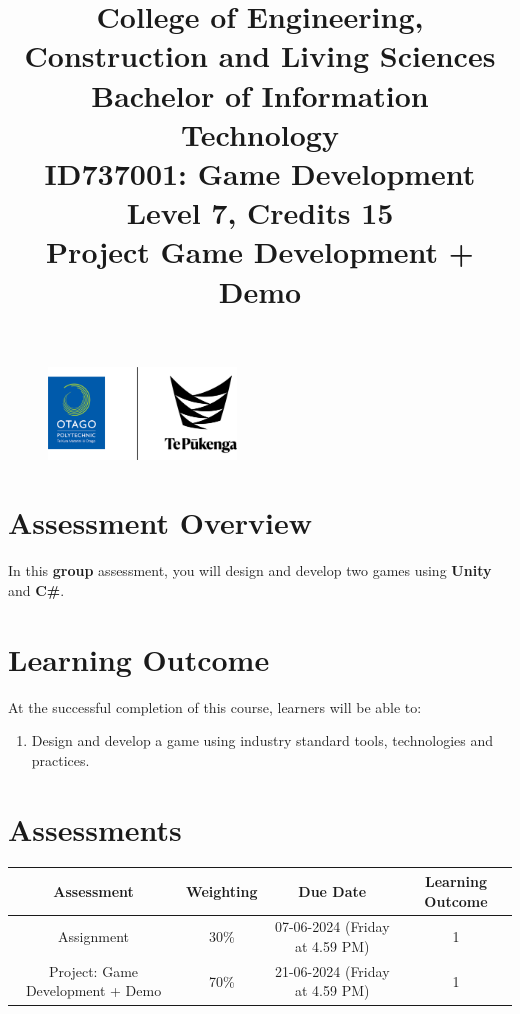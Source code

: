 \documentclass{article}
\author{}
\begin{document}
\begin{figure}
	\centering
	\includegraphics[width=50mm]{../../resources/img/logo.png}
\end{figure}

\title{College of Engineering, Construction and Living Sciences\\Bachelor of Information Technology\\ID737001: Game Development\\Level 7, Credits 15\\\textbf{Project Game Development + Demo}}
\date{}
\maketitle

\section*{Assessment Overview}
In this \textbf{group} assessment, you will design and develop two games using \textbf{Unity} and \textbf{C\#}. 

\section*{Learning Outcome}
At the successful completion of this course, learners will be able to:
\begin{enumerate}
	\item Design and develop a game using industry standard tools, technologies and practices.
\end{enumerate}

\section*{Assessments}
\renewcommand{\arraystretch}{1.5}
\begin{tabular}{|c|c|c|c|}
	\hline
	\textbf{Assessment}                                 & \textbf{Weighting} & \textbf{Due Date}            & \textbf{Learning Outcome} \\ \hline
	\small Assignment  & \small 30\%        & \small 07-06-2024 (Friday at 4.59 PM)   & \small 1                  \\ \hline
	\small Project: Game Development + Demo & \small 70\%        & \small 21-06-2024 (Friday at 4.59 PM)   & \small 1                   \\ \hline
\end{tabular} 
\end{document}
